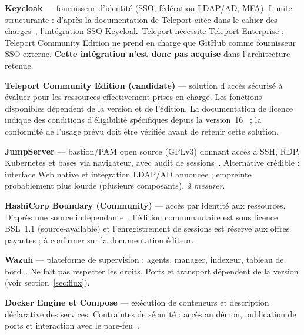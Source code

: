 \documentclass[11pt,a4paper]{report}
\newcommand{\amesurer}{\emph{à mesurer}}
\begin{document}
\textbf{Keycloak} --- fournisseur d'identité (SSO, fédération LDAP/AD, MFA). Limite structurante : d'après la documentation de Teleport citée dans le cahier des charges~\cite{tp-keycloak}, l'intégration SSO Keycloak--Teleport nécessite Teleport Enterprise ; Teleport Community Edition ne prend en charge que GitHub comme fournisseur SSO externe. \textbf{Cette intégration n'est donc pas acquise} dans l'architecture retenue.

\textbf{Teleport Community Edition (candidate)} --- solution d'accès sécurisé à évaluer pour les ressources effectivement prises en charge. Les fonctions disponibles dépendent de la version et de l'édition. La documentation de licence indique des conditions d'éligibilité spécifiques depuis la version~16~\cite{tp-licence} ; la conformité de l'usage prévu doit être vérifiée avant de retenir cette solution.

\textbf{JumpServer} --- bastion/PAM open source (GPLv3) donnant accès à SSH, RDP, Kubernetes et bases via navigateur, avec audit de sessions~\cite{jumpserver}. Alternative crédible : interface Web native et intégration LDAP/AD annoncée ; empreinte probablement plus lourde (plusieurs composants), \amesurer{}.

\textbf{HashiCorp Boundary (Community)} --- accès par identité aux ressources. D'après une source indépendante~\cite{swi}, l'édition communautaire est sous licence BSL~1.1 (source-available) et l'enregistrement de sessions est réservé aux offres payantes ; à confirmer sur la documentation éditeur.

\textbf{Wazuh} --- plateforme de supervision : agents, manager, indexeur, tableau de bord~\cite{wazuh-arch}. Ne fait pas respecter les droits. Ports et transport dépendent de la version (voir section~\ref{sec:flux}).

\textbf{Docker Engine et Compose} --- exécution de conteneurs et description déclarative des services. Contraintes de sécurité : accès au démon, publication de ports et interaction avec le pare-feu~\cite{docker-sec,docker-fw}.
\end{document}

